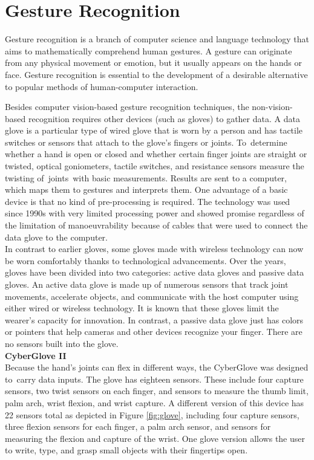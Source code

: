 \section{Gesture Recognition}
Gesture recognition is a branch of computer science and language technology that aims to mathematically comprehend human gestures. A gesture can originate from any physical movement or emotion, but it usually appears on the hands or face. \cite{smith2022hand} Gesture recognition is essential to the development of a desirable alternative to popular methods of human-computer interaction.

 Besides computer vision-based gesture recognition techniques, the non-vision-based recognition requires other devices (such as gloves) to gather data. \cite{bhuyan2017review}
A data glove is a particular type of wired glove that is worn by a person and has tactile switches or sensors that attach to the glove's fingers or joints. To determine whether a hand is open or closed and whether certain finger joints are straight or twisted, optical goniometers, tactile switches, and resistance sensors measure the twisting of joints with basic measurements. Results are sent to a computer, which maps them to gestures and interprets them. One advantage of a basic device is that no kind of pre-processing is required. The technology was used since 1990s with very limited processing power and showed promise  regardless of the limitation of manoeuvrability because of cables that were used to connect the data glove to the computer. \cite{premaratne2014human}
\\
In contrast to earlier gloves, some gloves made with wireless technology can now be worn comfortably thanks to technological advancements. Over the years, gloves have been divided into two categories: active data gloves and passive data gloves. An active data glove is made up of numerous sensors that track joint movements, accelerate objects, and communicate with the host computer using either wired or wireless technology. It is known that these gloves limit the wearer's capacity for innovation. In contrast, a passive data glove just has colors or pointers that help cameras and other devices recognize your finger. There are no sensors built into the glove.\\

\textbf{CyberGlove II}\label{txt:glove}\\
Because the hand's joints can flex in different ways, the CyberGlove was designed to~carry data inputs. The glove has eighteen sensors. These include four capture sensors, two twist sensors on each finger, and sensors to measure the thumb limit, palm arch, wrist flexion, and wrist capture. A different version of this device has 22 sensors total  as depicted in Figure \ref{fig:glove}, including four capture sensors, three flexion sensors for each finger, a palm arch sensor, and sensors for measuring the flexion and capture of the wrist. One glove version allows the user to write, type, and grasp small objects with their fingertips open.

